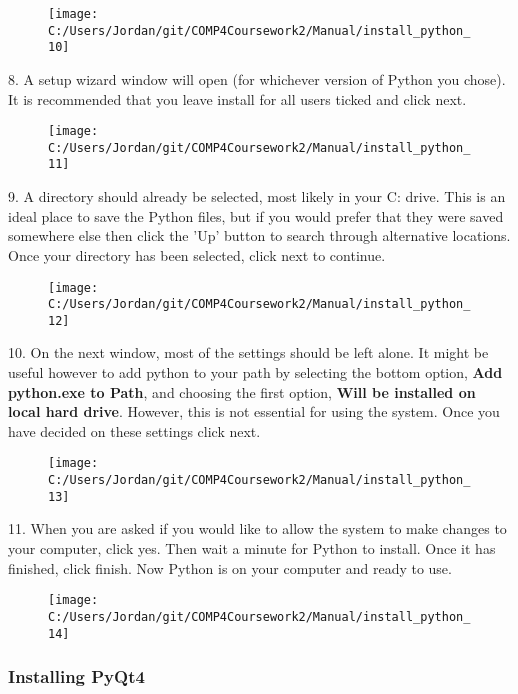 \begin{figure}[H]
    \texttt{[image: C:/Users/Jordan/git/COMP4Coursework2/Manual/install\_python\_10]}
\end{figure}

8. A setup wizard window will open (for whichever version of Python you chose). It is recommended that you leave install for all users ticked and click next.

\begin{figure}[H]
    \texttt{[image: C:/Users/Jordan/git/COMP4Coursework2/Manual/install\_python\_11]}
\end{figure}

9. A directory should already be selected, most likely in your C: drive. This is an ideal place to save the Python files, but if you would prefer that they were saved somewhere else then click the 'Up' button to search through alternative locations. Once your directory has been selected, click next to continue.

\begin{figure}[H]
    \texttt{[image: C:/Users/Jordan/git/COMP4Coursework2/Manual/install\_python\_12]}
\end{figure}

10. On the next window, most of the settings should be left alone. It might be useful however to add python to your path by selecting the bottom option, \textbf{Add python.exe to Path}, and choosing the first option, \textbf{Will be installed on local hard drive}. However, this is not essential for using the system. Once you have decided on these settings click next.

\begin{figure}[H]
    \texttt{[image: C:/Users/Jordan/git/COMP4Coursework2/Manual/install\_python\_13]}
\end{figure}

11. When you are asked if you would like to allow the system to make changes to your computer, click yes. Then wait a minute for Python to install. Once it has finished, click finish. Now Python is on your computer and ready to use.

\begin{figure}[H]
    \texttt{[image: C:/Users/Jordan/git/COMP4Coursework2/Manual/install\_python\_14]}
\end{figure}

\subsubsection{Installing PyQt4}

